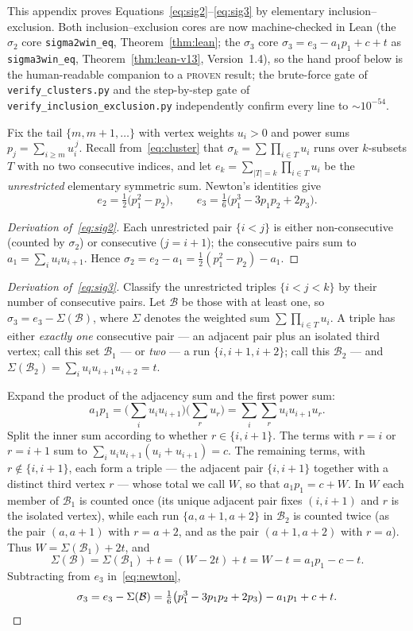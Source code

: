 \documentclass[11pt]{article}
\begin{document}
This appendix proves Equations~\eqref{eq:sig2}--\eqref{eq:sig3} by elementary
inclusion--exclusion. Both inclusion--exclusion cores are now machine-checked in Lean
(the $\sigma_2$ core \texttt{sigma2win\_eq}, Theorem~\ref{thm:lean}; the $\sigma_3$ core
$\sigma_3=e_3-a_1p_1+c+t$ as \texttt{sigma3win\_eq}, Theorem~\ref{thm:lean-v13},
Version~1.4), so the hand proof below is the human-readable companion to a
\textsc{proven} result; the brute-force gate of \texttt{verify\_clusters.py} and the
step-by-step gate of \texttt{verify\_inclusion\_exclusion.py} independently confirm
every line to $\sim10^{-54}$.

Fix the tail $\{m,m+1,\dots\}$ with vertex weights $u_i>0$ and power sums
$p_j=\sum_{i\ge m}u_i^{\,j}$. Recall from~\eqref{eq:cluster} that
$\sigma_k=\sum\prod_{i\in T}u_i$ runs over $k$-subsets $T$ with no two consecutive
indices, and let $e_k=\sum_{|T|=k}\prod_{i\in T}u_i$ be the \emph{unrestricted}
elementary symmetric sum. Newton's identities give
\begin{equation}\label{eq:newton}
  e_2=\tfrac12\big(p_1^2-p_2\big),\qquad
  e_3=\tfrac16\big(p_1^3-3p_1p_2+2p_3\big).
\end{equation}

\begin{proof}[Derivation of~\eqref{eq:sig2}]
Each unrestricted pair $\{i<j\}$ is either non-consecutive (counted by $\sigma_2$)
or consecutive ($j=i+1$); the consecutive pairs sum to $a_1=\sum_i u_iu_{i+1}$.
Hence $\sigma_2=e_2-a_1=\tfrac12(p_1^2-p_2)-a_1$.
\end{proof}

\begin{proof}[Derivation of~\eqref{eq:sig3}]
Classify the unrestricted triples $\{i<j<k\}$ by their number of consecutive pairs.
Let $\mathcal B$ be those with at least one, so $\sigma_3=e_3-\Sigma(\mathcal B)$,
where $\Sigma$ denotes the weighted sum $\sum\prod_{i\in T}u_i$. A triple has either
\emph{exactly one} consecutive pair --- an adjacent pair plus an isolated third
vertex; call this set $\mathcal B_1$ --- or \emph{two} --- a run $\{i,i+1,i+2\}$;
call this $\mathcal B_2$ --- and $\Sigma(\mathcal B_2)=\sum_i u_iu_{i+1}u_{i+2}=t$.

Expand the product of the adjacency sum and the first power sum:
\[
  a_1p_1=\Big(\sum_i u_iu_{i+1}\Big)\Big(\sum_r u_r\Big)
        =\sum_i\sum_r u_iu_{i+1}u_r .
\]
Split the inner sum according to whether $r\in\{i,i+1\}$. The terms with $r=i$ or
$r=i+1$ sum to $\sum_i u_iu_{i+1}(u_i+u_{i+1})=c$. The remaining terms, with
$r\notin\{i,i+1\}$, each form a triple --- the adjacent pair $\{i,i+1\}$ together
with a distinct third vertex $r$ --- whose total we call $W$, so that $a_1p_1=c+W$.
In $W$ each member of $\mathcal B_1$ is counted once (its unique adjacent pair fixes
$(i,i+1)$ and $r$ is the isolated vertex), while each run $\{a,a+1,a+2\}$ in
$\mathcal B_2$ is counted twice (as the pair $(a,a+1)$ with $r=a+2$, and as the pair
$(a+1,a+2)$ with $r=a$). Thus $W=\Sigma(\mathcal B_1)+2t$, and
\[
  \Sigma(\mathcal B)=\Sigma(\mathcal B_1)+t=(W-2t)+t=W-t=a_1p_1-c-t .
\]
Subtracting from $e_3$ in~\eqref{eq:newton},
\[
  \sigma_3=e_3-\Sigma(\mathcal B)
          =\tfrac16\big(p_1^3-3p_1p_2+2p_3\big)-a_1p_1+c+t . \qedhere
\]
\end{proof}
\end{document}
